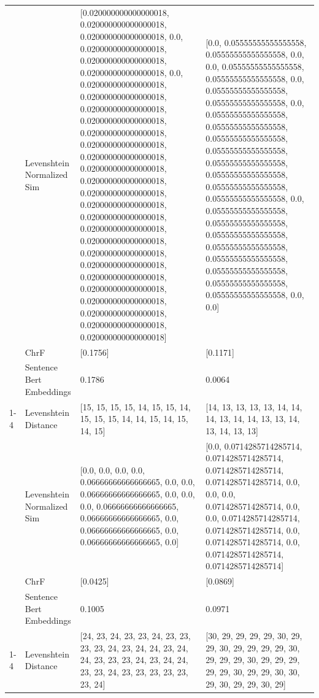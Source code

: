 \begin{tabular}{llll}
 & Levenshtein Normalized Sim & [0.020000000000000018, 0.020000000000000018, 0.020000000000000018, 0.0, 0.020000000000000018, 0.020000000000000018, 0.020000000000000018, 0.0, 0.020000000000000018, 0.020000000000000018, 0.020000000000000018, 0.020000000000000018, 0.020000000000000018, 0.020000000000000018, 0.020000000000000018, 0.020000000000000018, 0.020000000000000018, 0.020000000000000018, 0.020000000000000018, 0.020000000000000018, 0.020000000000000018, 0.020000000000000018, 0.020000000000000018, 0.020000000000000018, 0.020000000000000018, 0.020000000000000018, 0.020000000000000018, 0.020000000000000018, 0.020000000000000018, 0.020000000000000018] & [0.0, 0.05555555555555558, 0.05555555555555558, 0.0, 0.0, 0.05555555555555558, 0.05555555555555558, 0.0, 0.05555555555555558, 0.05555555555555558, 0.0, 0.05555555555555558, 0.05555555555555558, 0.05555555555555558, 0.05555555555555558, 0.05555555555555558, 0.05555555555555558, 0.05555555555555558, 0.05555555555555558, 0.0, 0.05555555555555558, 0.05555555555555558, 0.05555555555555558, 0.05555555555555558, 0.05555555555555558, 0.05555555555555558, 0.05555555555555558, 0.05555555555555558, 0.0, 0.0] \\
 & ChrF & [0.1756] & [0.1171] \\
 & Sentence Bert Embeddings & 0.1786 & 0.0064 \\
\cline{1-4}
\multirow[t]{4}{*}{Kurita ni kuru} & Levenshtein Distance & [15, 15, 15, 15, 14, 15, 15, 14, 15, 15, 15, 14, 14, 15, 14, 15, 14, 15] & [14, 13, 13, 13, 13, 14, 14, 14, 13, 14, 14, 13, 13, 14, 13, 14, 13, 13] \\
 & Levenshtein Normalized Sim & [0.0, 0.0, 0.0, 0.0, 0.06666666666666665, 0.0, 0.0, 0.06666666666666665, 0.0, 0.0, 0.0, 0.06666666666666665, 0.06666666666666665, 0.0, 0.06666666666666665, 0.0, 0.06666666666666665, 0.0] & [0.0, 0.0714285714285714, 0.0714285714285714, 0.0714285714285714, 0.0714285714285714, 0.0, 0.0, 0.0, 0.0714285714285714, 0.0, 0.0, 0.0714285714285714, 0.0714285714285714, 0.0, 0.0714285714285714, 0.0, 0.0714285714285714, 0.0714285714285714] \\
 & ChrF & [0.0425] & [0.0869] \\
 & Sentence Bert Embeddings & 0.1005 & 0.0971 \\
\cline{1-4}
\multirow[t]{4}{*}{Mugunda uraga na rutere} & Levenshtein Distance & [24, 23, 24, 23, 23, 24, 23, 23, 23, 23, 24, 23, 24, 24, 23, 24, 24, 23, 23, 23, 24, 23, 24, 24, 23, 23, 24, 23, 23, 23, 23, 23, 23, 24] & [30, 29, 29, 29, 29, 30, 29, 29, 30, 29, 29, 29, 29, 30, 29, 29, 29, 30, 29, 29, 29, 29, 29, 30, 29, 29, 30, 30, 29, 30, 29, 29, 30, 29] \\

\end{tabular}
